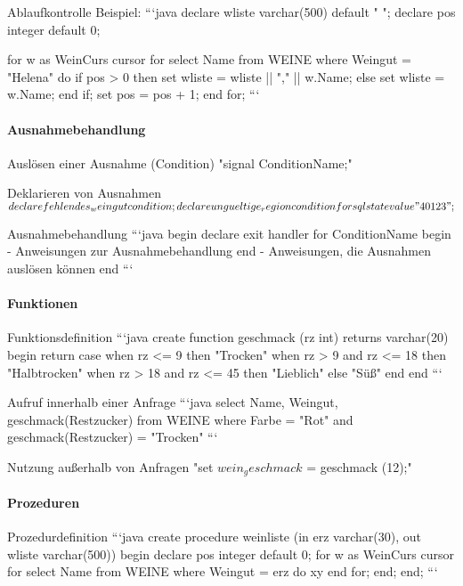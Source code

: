 \documentclass[a4paper]{article}
\begin{document}
\begin{multicols}{3}
    Ablaufkontrolle Beispiel:
    ```java
    declare wliste varchar(500) default " ";
    declare pos integer default 0;

    for w as WeinCurs cursor for
    select Name from WEINE where Weingut = "Helena"
    do
    if pos > 0 then
    set wliste = wliste || "," || w.Name;
    else
    set wliste = w.Name;
    end if;
    set pos = pos + 1;
    end for;
    ```

    \paragraph{Ausnahmebehandlung}
    \begin{itemize*}
        \item Auslösen einer Ausnahme (Condition) "signal ConditionName;"
        \item Deklarieren von Ausnahmen
        $declare fehlendes_weingut condition;
            declare ungueltige_region
            condition for sqlstate value "40123";$
        \item Ausnahmebehandlung
        ```java
        begin
        declare exit handler for ConditionName
        begin
        - Anweisungen zur Ausnahmebehandlung
        end
        - Anweisungen, die Ausnahmen auslösen können
        end
        ```
    \end{itemize*}

    \paragraph{Funktionen}
    \begin{itemize*}
        \item Funktionsdefinition
        ```java
        create function geschmack (rz int)
        returns varchar(20)
        begin
        return case
        when rz <= 9 then "Trocken"
        when rz > 9 and rz <= 18 then "Halbtrocken"
        when rz > 18 and rz <= 45 then "Lieblich"
        else "Süß"
        end
        end
        ```
        \item Aufruf innerhalb einer Anfrage
        ```java
        select Name, Weingut, geschmack(Restzucker) from WEINE
        where Farbe = "Rot" and geschmack(Restzucker) = "Trocken"
        ```
        \item Nutzung außerhalb von Anfragen "set $wein_geschmack$ = geschmack (12);"
    \end{itemize*}

    \paragraph{Prozeduren}
    Prozedurdefinition
    ```java
    create procedure weinliste (in erz varchar(30),
    out wliste varchar(500))
    begin
    declare pos integer default 0;
    for w as WeinCurs cursor for
    select Name from WEINE where Weingut = erz
    do xy
    end for;
    end; end;
    ```


\end{multicols}
\end{document}
